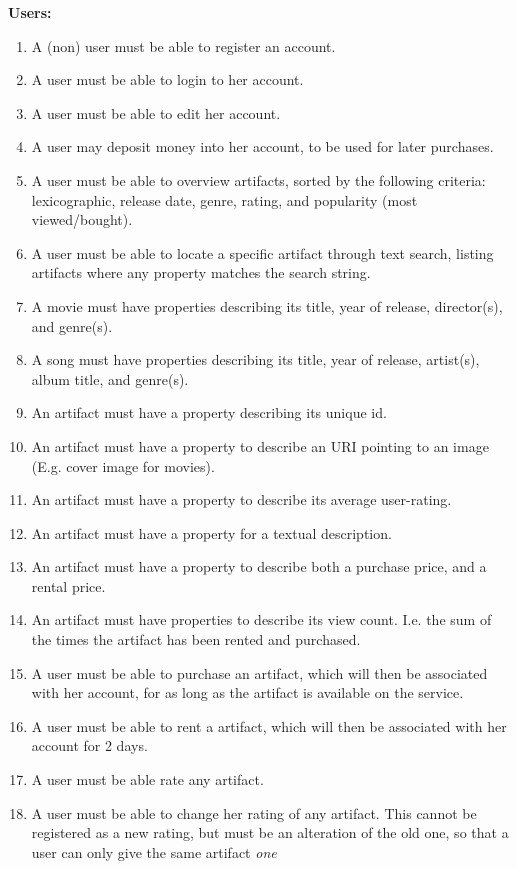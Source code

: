 \textbf{Users:}
\begin{enumerate}
\item A (non) user must be able to register an account.
\item A user must be able to login to her account.
\item A user must be able to edit her account.
\item A user may deposit money into her account, to be used for later
	purchases.
\item A user must be able to overview artifacts, sorted by the following
	criteria: lexicographic, release date, genre, rating, and
	popularity (most viewed/bought).
\item A user must be able to locate a specific artifact through text search,
	listing artifacts where any property matches the search string.
\item A movie must have properties describing its title, year of
	release, director(s), and genre(s).
\item A song must have properties describing its title, year of
	release, artist(s), album title, and genre(s).
\item An artifact must have a property describing its unique id.
\item An artifact must have a property to describe an URI pointing to an image
	(E.g. cover image for movies).
\item An artifact must have a property to describe its average user-rating.
\item An artifact must have a property for a textual description.
\item An artifact must have a property to describe both a purchase price, and a
	rental price.
\item An artifact must have properties to describe its view count. I.e. the sum
	of the times the artifact has been rented and purchased.
\item A user must be able to purchase an artifact, which will then be associated
	with her account, for as long as the artifact is available on the
	service.
\item A user must be able to rent a artifact, which will then be associated
	with her account for 2 days.
\item A user must be able rate any artifact.
\item A user must be able to change her rating of any artifact.
	This cannot be registered as a new rating, but must be an alteration of
	the old one, so that a user can only give the same artifact \emph{one}

\end{enumerate}
